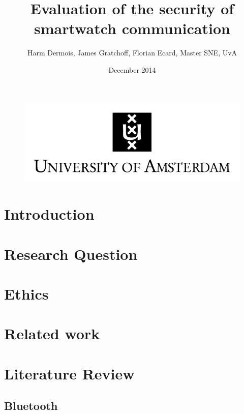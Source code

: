 \documentclass{article}
\begin{document}
 

\begin{figure}[!h]
 	\begin{center}
		\huge \title{Evaluation of the security of smartwatch communication}
		\author{Harm Dermois, James Gratchoff, Florian Ecard,  Master SNE, UvA} 
		\date{December 2014\\}
	\maketitle 
		\includegraphics{uva.jpeg}
		\label{sec:uva}
	\end{center}
\end{figure}

\newpage

\tableofcontents

\newpage

\section{Introduction}
\newpage
\section{Research Question}
\newpage
\section{Ethics} %

\newpage
\section{Related work}

\newpage
\section{Literature Review}

	\subsection{Bluetooth}
\end{document}

